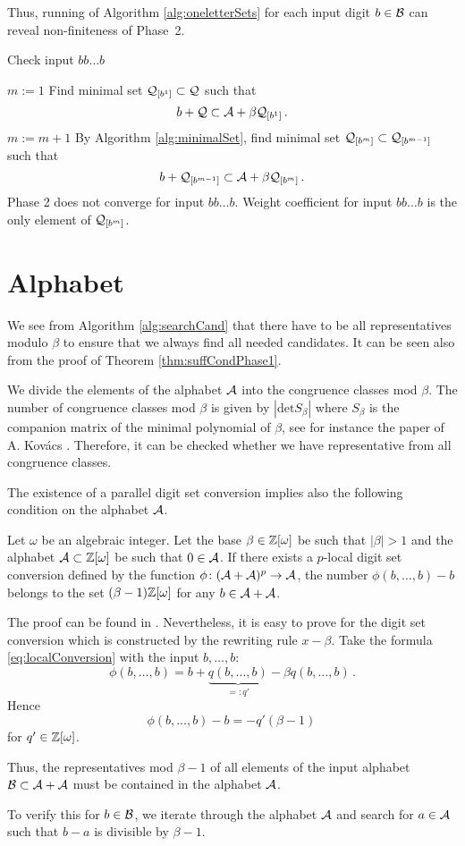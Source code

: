 Thus, running of Algorithm \ref{alg:oneletterSets} for each input digit $b\in\mathcal{B}$ can reveal non-finiteness of Phase~2.

\begin{algorithm}
  \caption{Check input $bb\dots b$}
    \label{alg:oneletterSets}
  \begin{algorithmic}[1]
    \STATE $m:=1$
    \STATE Find minimal set $\mathcal{Q}_{[b^{1}]} \subset \mathcal{Q}$ such that
      $$
      b + \mathcal{Q} \subset \mathcal{A} + \beta \mathcal{Q}_{[b^{1}]}\,.
      $$
      \vspace{-20pt}
        \STATE $m:= m +1$
        \STATE By Algorithm \ref{alg:minimalSet}, find minimal set $\mathcal{Q}_{[b^{m}]} \subset \mathcal{Q}_{[b^{m-1}]}$ such that
          $$
          b + \mathcal{Q}_{[b^{m-1}]} \subset \mathcal{A} + \beta \mathcal{Q}_{[b^{m}]}\,.
          $$  
          \vspace{-20pt}
            \RETURN Phase 2 does not converge for input $bb\dots b$.
        \ENDIF
    \ENDWHILE  
    \RETURN Weight coefficient for input $bb\dots b$ is the only element of $\mathcal{Q}_{[b^{m}]}$.
  \end{algorithmic}
\end{algorithm}


\section{Alphabet}
\label{sec:alphabet}
We see from Algorithm \ref{alg:searchCand} that there have to be all representatives modulo $\beta$ to ensure that we always find all needed candidates. It can be seen also from the proof of Theorem \ref{thm:suffCondPhase1}. 

We divide the elements of the alphabet $\mathcal{A}$ into the congruence classes mod $\beta$. The number of congruence classes mod $\beta$ is given by $|\text{det} S_\beta|$ where $S_\beta$ is the companion matrix of the minimal polynomial of $\beta$, see for instance the paper of A. Kov\'acs \cite{kovacs}. Therefore, it can be checked whether we have representative from all congruence classes.


The existence of a parallel digit set conversion implies also the following condition on the alphabet $\mathcal{A}$.   
\begin{theo}
Let $\omega$ be an algebraic integer. Let the base $\beta\in\mathbb{Z}[\omega]$ be such that $|\beta|>1$ and the alphabet $\mathcal{A}\subset\mathbb{Z}[\omega]$ be such that $0\in\mathcal{A}$. If there exists a $p$-local digit set conversion defined by the function $\phi\colon (\mathcal{A}+\mathcal{A})^p\rightarrow \mathcal{A}$, the number $\phi(b,\dots,b)-b$ belongs to the set $(\beta-1)\mathbb{Z}[\omega]$ for any $b\in\mathcal{A}+\mathcal{A}$. 
\end{theo}
The proof can be found in \cite{minAlph}. Nevertheless, it is easy to prove for the digit set conversion which is constructed by the rewriting rule $x-\beta$. Take the formula \eqref{eq:localConversion} with the input $b,\dots,b$:
$$
    \phi(b, \dots, b)=b+ \underbrace{q(b, \dots, b)}_{=:q'} - \beta q(b, \dots, b)\,.
$$
Hence
$$
\phi(b, \dots, b)-b=-q'(\beta-1)\,
$$
for $q'\in\mathbb{Z}[\omega]$.

Thus, the representatives mod $\beta-1$ of all elements of the input alphabet $\mathcal{B}\subset\mathcal{A}+\mathcal{A}$ must be contained in the alphabet $\mathcal{A}$. 

To verify this for $b\in\mathcal{B}$, we iterate through the alphabet $\mathcal{A}$ and search for $a\in\mathcal{A}$ such that $b-a$ is divisible by $\beta-1$.

